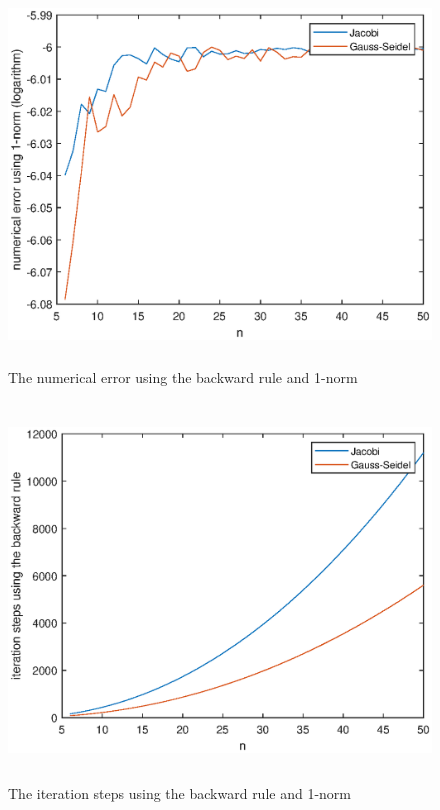 \documentclass[UTF8,a4paper,10pt]{ctexart}
\begin{document}
\begin{figure}[ht]
    \centering
    \includegraphics[width=14cm,height=10cm]{2.1_error_backward_1.eps}
    \caption{The numerical error using the backward rule and 1-norm}
\end{figure}
\begin{figure}[ht]
    \centering
    \includegraphics[width=14cm,height=10cm]{2.1_steps_backward_1.eps}
    \caption{The iteration steps using the backward rule and 1-norm}
\end{figure}
\end{document}
